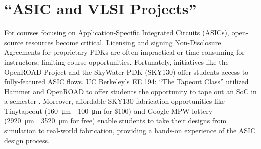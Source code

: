\section{\enquote{ASIC and VLSI Projects}}

For courses focusing on Application-Specific Integrated Circuits (ASICs), open-source resources become critical. Licensing and signing Non-Disclosure Agreements for proprietary PDKs are often impractical or time-consuming for instructors, limiting course opportunities. Fortunately, initiatives like the OpenROAD Project and the SkyWater PDK (SKY130) offer students access to fully-featured ASIC flows. UC Berkeley's EE 194: \enquote{The Tapeout Class} utilized Hammer and OpenROAD to offer students the opportunity to tape out an SoC in a semester \cite{ZhaoLatchUp}. Moreover, affordable SKY130 fabrication opportunities like Tinytapeout (\SI{160}{\micro\metre}~\texttimes~\SI{100}{\micro\metre} for \$100) \cite{tinytapeoutTinyTapeout} and Google MPW lottery (\SI{2920}{\micro\metre}~\texttimes~\SI{3520}{\micro\metre} for free) \cite{efablessCaravel} enable students to take their designs from simulation to real-world fabrication, providing a hands-on experience of the ASIC design process.
